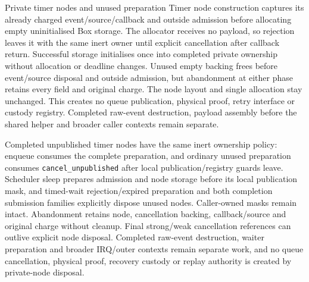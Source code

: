 \begin{implementationdetail}{Private timer nodes and unused preparation}
Timer node construction captures its already charged event/source/callback and
outside admission before allocating empty uninitialised Box storage. The
allocator receives no payload, so rejection leaves it with the same inert owner
until explicit cancellation after callback return. Successful storage initialises
once into completed private ownership without allocation or deadline changes.
Unused empty backing frees before event/source disposal and outside admission, but
abandonment at either phase retains every field and original charge. The node
layout and single allocation stay unchanged. This creates no queue publication,
physical proof, retry interface or custody registry. Completed raw-event
destruction, payload assembly before the shared helper and broader
caller contexts remain separate.

Completed unpublished timer nodes have the same inert ownership policy:
enqueue consumes the complete preparation, and ordinary unused preparation
consumes \texttt{cancel\_unpublished} after local publication/registry guards
leave. Scheduler sleep prepares admission and node storage before its local
publication mask, and timed-wait rejection/expired preparation and both completion
submission families explicitly dispose unused nodes. Caller-owned masks remain
intact. Abandonment retains node, cancellation backing, callback/source and
original charge without cleanup. Final strong/weak cancellation references can
outlive explicit node disposal. Completed raw-event destruction,
waiter preparation and broader IRQ/outer contexts remain separate work, and no
queue cancellation, physical proof, recovery custody or replay authority is
created by private-node disposal.
\end{implementationdetail}

